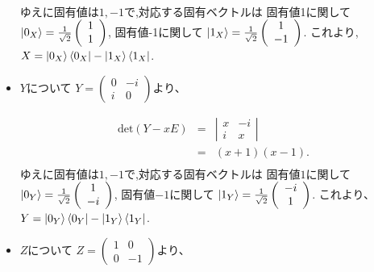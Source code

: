\begin{itemize}
\begin{eqnarray*}
\end{eqnarray*}
ゆえに固有値は$1, -1$で,対応する固有ベクトルは
\newline
固有値1に関して
$\ket{0_X} = \frac{1}{\sqrt{2}}
\left( \begin{array}{c}
	1\\
	1
	\end{array}
\right)
$,
固有値-1に関して
$\ket{1_X} = \frac{1}{\sqrt{2}}
\left( \begin{array}{c}
	1\\
	-1
	\end{array}
\right)
$.
\newline
これより,
$X = \ket{0_X}\bra{0_X} - \ket{1_X}\bra{1_X}$.
\newline
\item $Y$について
$Y = \left(
	\begin{array}{cc}
	0&-i\\
	i&0
	\end{array}
\right)
$より、

\begin{eqnarray*}
\mathrm{det}(Y - xE) &=& \left| \begin{array}{cc}
	x & -i\\
	i & x
	\end{array}
	\right|\\
	&=& (x + 1)(x - 1).\\
\end{eqnarray*}
ゆえに固有値は$1, -1$で,対応する固有ベクトルは
\newline
固有値$1$に関して
$\ket{0_Y} = \frac{1}{\sqrt{2}}
\left( \begin{array}{c}
	1\\
	-i
	\end{array}
\right)
$,
固有値$-1$に関して
$\ket{1_Y} = \frac{1}{\sqrt{2}}
\left( \begin{array}{c}
	-i\\
	1
	\end{array}
\right)
$.
\newline
これより、
$Y = \ket{0_Y}\bra{0_Y} - \ket{1_Y}\bra{1_Y}$.
\newline
\item $Z$について
$
Z = \left(
	\begin{array}{cc}
	1&0\\
	0&-1
	\end{array}
\right)
$より、


\end{itemize}

